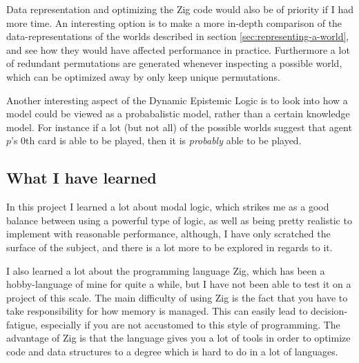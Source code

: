 Data representation and optimizing the Zig code would also be of priority if I had more time. An interesting option is to make a more in-depth comparison of the data-representations of the worlds described in section \ref{sec:representing-a-world}, and see how they would have affected performance in practice. Furthermore a lot of redundant permutations are generated whenever inspecting a possible world, which can be optimized away by only keep unique permutations.

Another interesting aspect of the Dynamic Epistemic Logic is to look into how a model could be viewed as a probabalistic model, rather than a certain knowledge model. 
For instance if a lot (but not all) of the possible worlds suggest that agent $p$'s 0th card is able to be played, then it is \emph{probably} able to be played.
\subsection{What I have learned}
In this project I learned a lot about modal logic, which strikes me as a good balance between using a powerful type of logic, as well as being pretty realistic to implement with reasonable performance, although, I have only scratched the surface of the subject, and there is a lot more to be explored in regards to it.

I also learned a lot about the programming language Zig, which has been a hobby-language of mine for quite a while, but I have not been able to test it on a project of this scale.
The main difficulty of using Zig is the fact that you have to take responsibility for how memory is managed. This can easily lead to decision-fatigue, especially if you are not accustomed to this style of programming.
The advantage of Zig is that the language gives you a lot of tools in order to optimize code and data structures to a degree which is hard to do in a lot of languages.



